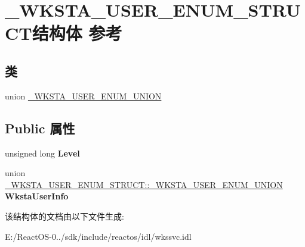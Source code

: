 \hypertarget{struct___w_k_s_t_a___u_s_e_r___e_n_u_m___s_t_r_u_c_t}{}\section{\+\_\+\+W\+K\+S\+T\+A\+\_\+\+U\+S\+E\+R\+\_\+\+E\+N\+U\+M\+\_\+\+S\+T\+R\+U\+C\+T结构体 参考}
\label{struct___w_k_s_t_a___u_s_e_r___e_n_u_m___s_t_r_u_c_t}
\subsection*{类}
\begin{DoxyCompactItemize}
\item 
union \hyperlink{union___w_k_s_t_a___u_s_e_r___e_n_u_m___s_t_r_u_c_t_1_1___w_k_s_t_a___u_s_e_r___e_n_u_m___u_n_i_o_n}{\+\_\+\+W\+K\+S\+T\+A\+\_\+\+U\+S\+E\+R\+\_\+\+E\+N\+U\+M\+\_\+\+U\+N\+I\+ON}
\end{DoxyCompactItemize}
\subsection*{Public 属性}
\begin{DoxyCompactItemize}
\item 
\mbox{\label{struct___w_k_s_t_a___u_s_e_r___e_n_u_m___s_t_r_u_c_t_a832b334b9768854576a2168a072cd3bd}} 
unsigned long {\bfseries Level}
\item 
\mbox{\label{struct___w_k_s_t_a___u_s_e_r___e_n_u_m___s_t_r_u_c_t_a24b8b8982fbe377a2e999975b9ecfdd1}} 
union \hyperlink{union___w_k_s_t_a___u_s_e_r___e_n_u_m___s_t_r_u_c_t_1_1___w_k_s_t_a___u_s_e_r___e_n_u_m___u_n_i_o_n}{\+\_\+\+W\+K\+S\+T\+A\+\_\+\+U\+S\+E\+R\+\_\+\+E\+N\+U\+M\+\_\+\+S\+T\+R\+U\+C\+T\+::\+\_\+\+W\+K\+S\+T\+A\+\_\+\+U\+S\+E\+R\+\_\+\+E\+N\+U\+M\+\_\+\+U\+N\+I\+ON} {\bfseries Wksta\+User\+Info}
\end{DoxyCompactItemize}


该结构体的文档由以下文件生成\+:\begin{DoxyCompactItemize}
\item 
E\+:/\+React\+O\+S-\/0../sdk/include/reactos/idl/wkssvc.\+idl\end{DoxyCompactItemize}
